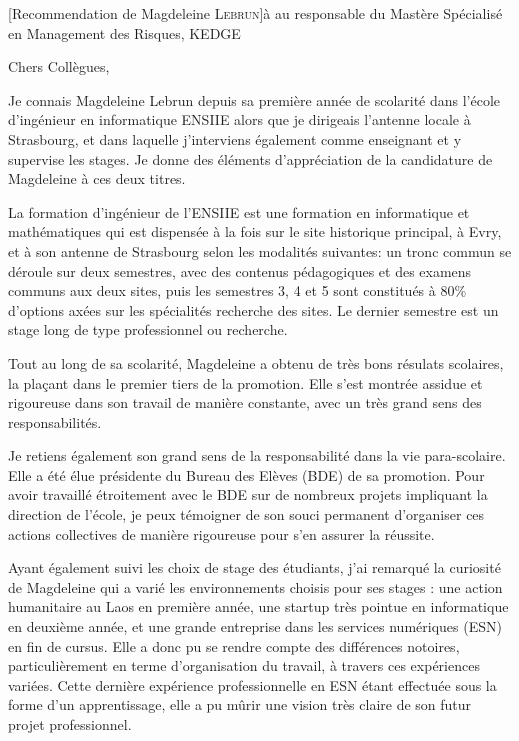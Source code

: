\documentclass[a4paper,10pt]{article}
\begin{document}

\begin{letter}[Recommendation de Magdeleine \textsc{Lebrun}]{à}%
{au responsable du Mastère Spécialisé en Management des Risques, KEDGE}

Chers Collègues,

Je connais Magdeleine Lebrun depuis sa  première année de scolarité dans l'école
d'ingénieur en  informatique ENSIIE  alors que je  dirigeais l'antenne  locale à
Strasbourg,  et  dans laquelle  j'interviens  également  comme enseignant  et  y
supervise les stages.  Je donne des éléments d'appréciation de la candidature de
Magdeleine à ces deux titres.


La formation d'ingénieur de l'ENSIIE est une formation en informatique et
mathématiques qui est dispensée à la fois sur le site
historique principal, à Evry, et à son antenne de Strasbourg selon les modalités
suivantes: un tronc commun se déroule sur deux semestres, avec des contenus 
pédagogiques et des examens communs aux deux sites, puis les semestres 3, 4 et 5
sont constitués à 80\% d'options axées sur les spécialités recherche des sites.
Le dernier semestre est un stage long de type professionnel ou recherche. 

Tout  au  long de  sa  scolarité,  Magdeleine a  obtenu  de  très bons  résulats
scolaires, la plaçant dans le premier tiers de la promotion. Elle s'est montrée
assidue et rigoureuse dans son travail de manière constante, avec un très grand
sens des responsabilités. 
 

Je  retiens  également  son  grand  sens   de  la  responsabilité  dans  la  vie
para-scolaire.  Elle  a été  élue présidente  du Bureau des  Elèves (BDE)  de sa
promotion.  Pour avoir travaillé étroitement avec le BDE sur de nombreux projets
impliquant la  direction de l'école,  je peux  témoigner de son  souci permanent
d'organiser ces actions  collectives de manière rigoureuse pour  s'en assurer la
réussite.

Ayant  également suivi  les  choix  de stage  des  étudiants,  j'ai remarqué  la
curiosité de Magdeleine qui a varié les environnements choisis pour ses stages :
une action  humanitaire au Laos en  première année, une startup  très pointue en
informatique  en deuxième  année, et  une  grande entreprise  dans les  services
numériques (ESN) en fin de cursus. Elle a donc pu se rendre compte des différences
notoires, particulièrement en terme d'organisation du travail, à travers ces
expériences variées. Cette dernière expérience professionnelle en ESN étant
effectuée sous la forme d'un apprentissage, elle a pu mûrir une vision très
claire de son futur projet professionnel.



\end{letter}
\end{document}
